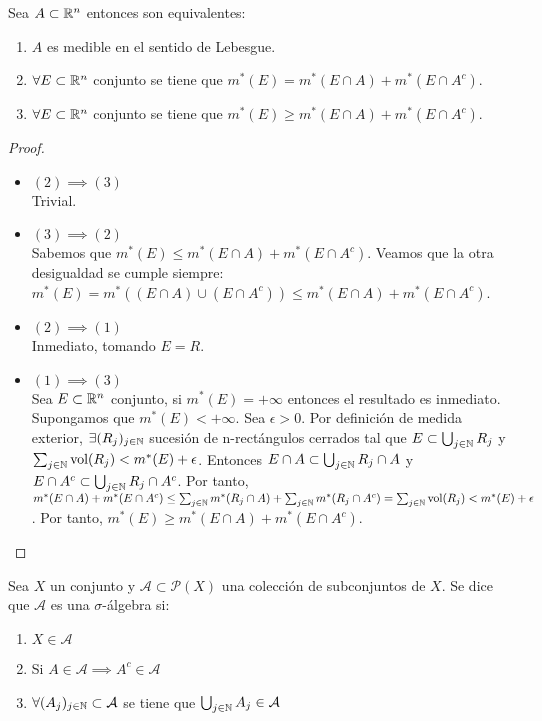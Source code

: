 \begin{proposición}
Sea $A \subset \mathbb{R}^n$ entonces son equivalentes:
\vspace{-0.5em}
\begin{enumerate}
    \item $A$ es medible en el sentido de Lebesgue.
    \item $\forall E \subset \mathbb{R}^n$ conjunto se tiene que $m^*(E) = m^*(E \cap A) + m^*(E \cap A^c)$.
    \item $\forall E \subset \mathbb{R}^n$ conjunto se tiene que $m^*(E) \geq m^*(E \cap A) + m^*(E \cap A^c)$.
\end{enumerate}
\end{proposición}

\begin{proof}
    \leavevmode
    \begin{itemize}
        \item $(2) \implies (3)$\\
              Trivial.
        \item $(3) \implies (2)$\\
              Sabemos que $m^*(E) \leq m^*(E \cap A) + m^*(E \cap A^c)$. Veamos que la otra desigualdad se cumple siempre: $m^*(E) = m^*((E \cap A) \cup (E \cap A^c)) \leq m^*(E \cap A) + m^*(E \cap A^c)$.
        \item $(2) \implies (1)$\\
              Inmediato, tomando $E = R$.
        \item $(1) \implies (3)$\\
              Sea $E \subset \mathbb{R}^n$ conjunto, si $m^*(E) = +\infty$ entonces el resultado es inmediato. Supongamos que $m^*(E) < +\infty$. Sea $\epsilon > 0$. Por definición de medida exterior, $\exists (R_j)_{j \in \mathbb{N}}$ sucesión de n-rectángulos cerrados tal que $E \subset \bigcup_{j \in \mathbb{N}} R_j$ y $\sum_{j \in \mathbb{N}} \text{vol}(R_j) < m^*(E) + \epsilon$. Entonces $E \cap A \subset \bigcup_{j \in \mathbb{N}} R_j \cap A$ y $E \cap A^c \subset \bigcup_{j \in \mathbb{N}} R_j \cap A^c$. Por tanto, $m^*(E \cap A) + m^*(E \cap A^c) \leq \sum_{j \in \mathbb{N}} m^*(R_j \cap A) + \sum_{j \in \mathbb{N}} m^*(R_j \cap A^c) = \sum_{j \in \mathbb{N}} \text{vol}(R_j) < m^*(E) + \epsilon$. Por tanto, $m^*(E) \geq m^*(E \cap A) + m^*(E \cap A^c)$.
    \end{itemize}
\end{proof}

\begin{definición}
Sea $X$ un conjunto y $\mathcal{A} \subset \mathcal{P}(X)$ una colección de subconjuntos de $X$. Se dice que $\mathcal{A}$ es una $\sigma$-álgebra si:
\vspace{-0.5em}
\begin{enumerate}
    \item $X \in \mathcal{A}$
    \item Si $A \in \mathcal{A} \implies A^c \in \mathcal{A}$
    \item $\forall (A_j)_{j \in \mathbb{N}} \subset \mathcal{A}$ se tiene que $\bigcup_{j \in \mathbb{N}} A_j \in \mathcal{A}$
\end{enumerate}
\end{definición}

